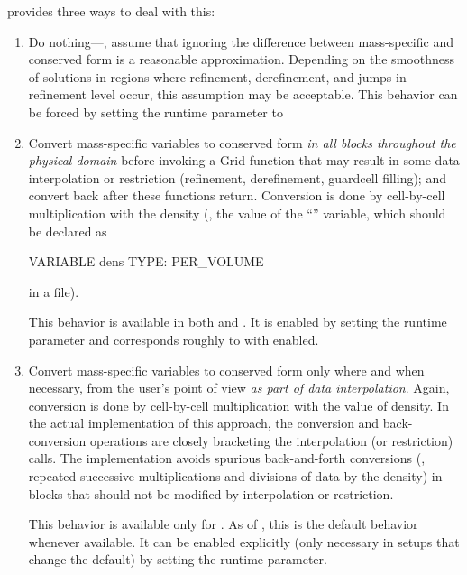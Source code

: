 \flashx provides three ways to deal with this:
\begin{enumerate}
\item Do nothing---\ie, assume that ignoring the difference between
mass-specific and conserved form is a reasonable approximation.
Depending on the smoothness of solutions in regions where refinement,
derefinement, and jumps in refinement level occur, this assumption may
be acceptable.
This behavior can be forced 
by setting the
{} runtime parameter to 

\item Convert mass-specific variables to conserved form
\emph{in all blocks throughout the physical domain}
before invoking a \unit{Grid} function that may
result in some data interpolation or restriction (refinement,
derefinement, guardcell filling); and convert back after these
functions return. Conversion is done by cell-by-cell multiplication
with the density (\ie, the value of the ``'' variable, which should be declared as
\begin{codeseg}
VARIABLE dens TYPE: PER_VOLUME
\end{codeseg}
in a  file).

This behavior is available in both   and .
It is enabled by setting the 
\newline 
{}
runtime parameter and corresponds roughly to \flashx with
\newline
{} enabled.

\item Convert mass-specific variables to conserved form
only where and when necessary, from the  user's
point of view \emph{as part of data interpolation}.
Again, conversion is done by cell-by-cell multiplication
with the value of density.
In the actual implementation of this approach, the
conversion and back-conversion operations are
closely bracketing the interpolation (or restriction) calls.
The implementation avoids spurious back-and-forth
conversions (\ie, repeated successive
multiplications and divisions of data by the density)
in blocks that should not be modified by interpolation or restriction.

This behavior is available only for .
As of \flashx, this is the default behavior whenever available.
It can be enabled explicitly 
(only necessary in setups that change the default) by setting the
\newline
{} runtime parameter.

\end{enumerate}




